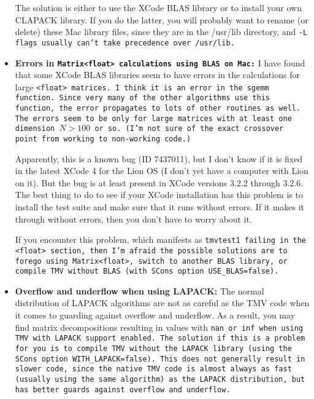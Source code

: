 \begin{itemize}
The solution is either to use the XCode BLAS library or to install your own CLAPACK
library.  If you do the latter, you will probably want to rename (or delete) these Mac
library files, since they are in the /usr/lib directory, and \tt{-L} flags usually can't take 
precedence over /usr/lib.

\item {\bf Errors in \tt{Matrix<float>} calculations using BLAS on Mac:}
I have found that some XCode BLAS libraries seem to have errors in the 
calculations for large \tt{<float>} matrices.  I think it is an error in the \tt{sgemm}
function.  Since very many of the other algorithms use this function, the error
propagates to lots of other routines as well.  The errors seem to be only for
large matrices with at least one dimension $N > 100$ or so.  (I'm not sure of the 
exact crossover point from working to non-working code.)

Apparently, this is a known bug (ID 7437011), but I don't know if it is fixed in the latest
XCode 4 for the Lion OS (I don't yet have a computer with Lion on it).  But the bug is
at least present in XCode versions 3.2.2 through 3.2.6.
The best thing to do to see if your XCode installation has this problem
is to install the test suite and make sure that it runs without errors.  If it makes it 
through without errors, then you don't have to worry about it.

If you encounter this problem, which manifests as \tt{tmvtest1} failing in the \tt{<float>} section,
then I'm afraid the possible solutions are to forego using \tt{Matrix<float>}, switch to another
BLAS library, or compile TMV without BLAS (with SCons option \tt{USE_BLAS=false}).

\item {\bf Overflow and underflow when using LAPACK:}
The normal distribution of LAPACK algorithms are not as careful as the TMV code when 
it comes to guarding against overflow and underflow.  As a result, you may find
matrix decompositions resulting in values with \tt{nan} or \tt{inf} when using TMV
with LAPACK support enabled.  The solution if this is a problem for you is to compile TMV without the LAPACK
library (using the SCons option \tt{WITH_LAPACK=false}).
This does not generally result in slower code, since the native TMV code is almost always
as fast (usually using the same algorithm) as the LAPACK distribution, but has better
guards against overflow and underflow.


\end{itemize}

